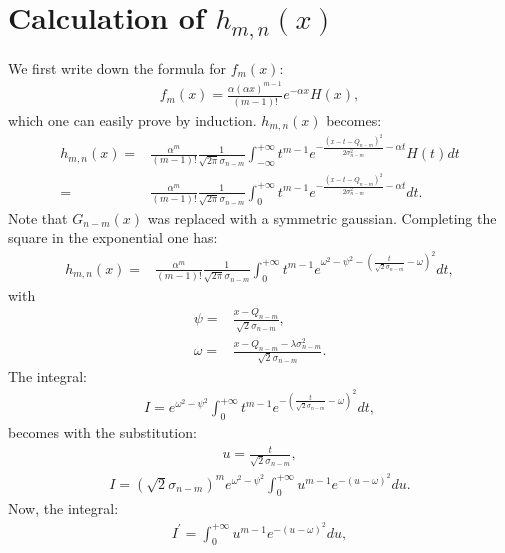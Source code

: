 \documentclass[a4paper,11pt]{article}
\begin{document}
\section{Calculation of $h_{m,n}(x)$}
\label{app:Imn}
%

We first write down the formula for $f_m(x)$:
\begin{align}
f_m(x) =  \frac{\alpha (\alpha x )^{m-1}}{(m-1)!} e^{-\alpha x } H(x),
\end{align}
which one can easily prove by induction. 
$h_{m,n}(x)$ becomes:
\begin{align}
h_{m,n}(x) = & \frac{ \alpha^{m}}{(m-1)!} \frac{1}{\sqrt{2\pi}\sigma_{n-m}} \int_{-\infty}^{+\infty} t^{m-1} e^{ -\frac{ (x-t -Q_{n-m})^2}{2\sigma^2_{n-m}}-\alpha t} H(t) dt \nonumber \\
                  = & \frac{ \alpha^{m}}{(m-1)!} \frac{1}{\sqrt{2\pi}\sigma_{n-m}} \int_{0}^{+\infty} t^{m-1} e^{ -\frac{ (x-t -Q_{n-m})^2}{2\sigma^2_{n-m}}-\alpha t} dt.
\end{align}
Note that $G_{n-m}(x)$ was replaced with a symmetric gaussian. 
Completing the square in the exponential one has:
\begin{align}
h_{m,n}(x) = & \frac{ \alpha^{m}}{(m-1)!} \frac{1}{\sqrt{2\pi}\sigma_{n-m}} \int_{0}^{+\infty} t^{m-1} e^{  \omega^2  -\psi^2  -\left( \frac{t}{\sqrt{2}\sigma_{n-m}} - \omega \right)^2} dt,
\end{align}
with 
\begin{align}
\psi = & \frac{x-Q_{n-m}}{\sqrt{2}\sigma_{n-m}}, \\
\omega = & \frac{x-Q_{n-m} -\lambda\sigma^2_{n-m}}{\sqrt{2}\sigma_{n-m}}.
\end{align}  
The integral:
\begin{align}
I =  e^{  \omega^2  -\psi^2 }\int_{0}^{+\infty} t^{m-1} e^{  -\left( \frac{t}{\sqrt{2}\sigma_{n-m}} - \omega \right)^2} dt,
\end{align}
becomes with the substitution:
\begin{align}
u = \frac{t}{\sqrt{2}\sigma_{n-m}},
\end{align}
\begin{align}
I =  (\sqrt{2}\sigma_{n-m})^m e^{  \omega^2  -\psi^2 }\int_{0}^{+\infty} u^{m-1} e^{  -\left( u - \omega \right)^2} du.
\end{align}
Now, the integral:
\begin{align}
I^\prime = \int_{0}^{+\infty} u^{m-1} e^{  -\left( u - \omega \right)^2} du,
\end{align}
\end{document}
